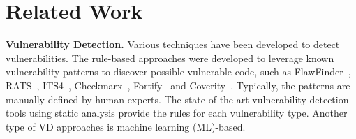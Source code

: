 \section{Related Work}
\label{sec:rw}

{\bf Vulnerability Detection.} Various techniques have been developed
to detect vulnerabilities.
The rule-based approaches were developed to leverage known vulnerability patterns to discover possible vulnerable code, such as FlawFinder~\cite{FlawFinder}, RATS~\cite{RATS}, ITS4~\cite{viega2000its4}, Checkmarx~\cite{Checkmarx}, Fortify~\cite{HPFortify} and Coverity~\cite{Coverity}.
Typically, the patterns are manually defined by human experts. The state-of-the-art vulnerability detection tools using static analysis provide the
rules for each vulnerability type.
Another type of VD approaches is machine learning (ML)-based.
